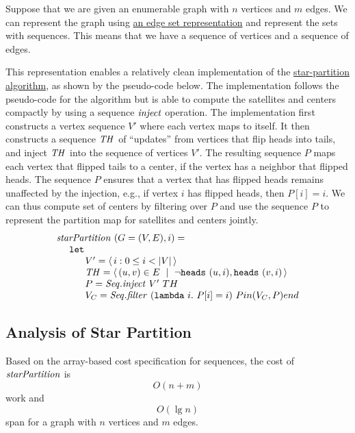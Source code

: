 \begin{gram}[Implementation]
Suppose that we are given an enumerable graph with $n$ vertices and $m$ edges. 
%
We can represent the graph using 
%
\href{sec:graphs:graphs::edgesets}{an edge set representation}
%
and represent the sets with sequences.
%
This means that we have a sequence of vertices and a sequence of edges.
%

This representation enables a relatively clean implementation of the
%
\href{alg:graphcon::star-partition}{star-partition algorithm},
%
as shown by the pseudo-code below.
%
The implementation follows the pseudo-code for the algorithm but is able to compute the satellites and centers compactly by using a sequence $\mathit{inject}$ operation.
%
The implementation first constructs a vertex sequence $V'$ where each vertex maps to itself.
%
It then constructs a sequence 
%
$\mathit{TH}$ 
%
of ``updates'' from vertices that flip heads into tails,
%
and inject $\mathit{TH}$ into the sequence of vertices $V'$.
%
The resulting sequence $P$ maps each vertex that flipped tails to  a center, if the vertex has a neighbor that flipped heads.
%
The sequence $P$ ensures that a vertex that has flipped heads  remains unaffected by the injection, e.g., if vertex $i$ has flipped heads, then 
%
$P[i] = i$.
%
We can thus compute set of centers by filtering over $P$ and use the sequence $P$ to represent the partition map for satellites and centers jointly.
\[
\begin{array}{l}
\mathit{starPartition}~(G = (V, E), i) =
\\
~~~~\texttt{let}
\\
~~~~~~~~~V' = \left\langle\, i : 0 \le i < |V| \,\right\rangle
\\
~~~~~~~~~\mathit{TH} = \left\langle\,  (u,v) \in E ~\mid~ \neg \texttt{heads}~(u, i), \texttt{heads}~(v, i)  \,\right\rangle
\\
~~~~~~~~~P = \mathit{Seq.inject}~V'~TH
\\
~~~~~~~~~V_C = \mathit{Seq.filter}~(\texttt{lambda}~i.~P[i] = i)~P
in (V_C, P) end
\end{array}
\]
\end{gram}

\subsection{Analysis of Star Partition}
\label{sec:graphcon::star::partition::analysis}


\begin{theorem}
\label{thm:graphcon::star::partition::analysis}
Based on the array-based cost specification for sequences, the cost of $\mathit{starPartition}$ is 
\[
O(n + m)
\]
work and 
\[
O(\lg n)
\]
span for a graph with $n$ vertices and $m$ edges.
\end{theorem}

